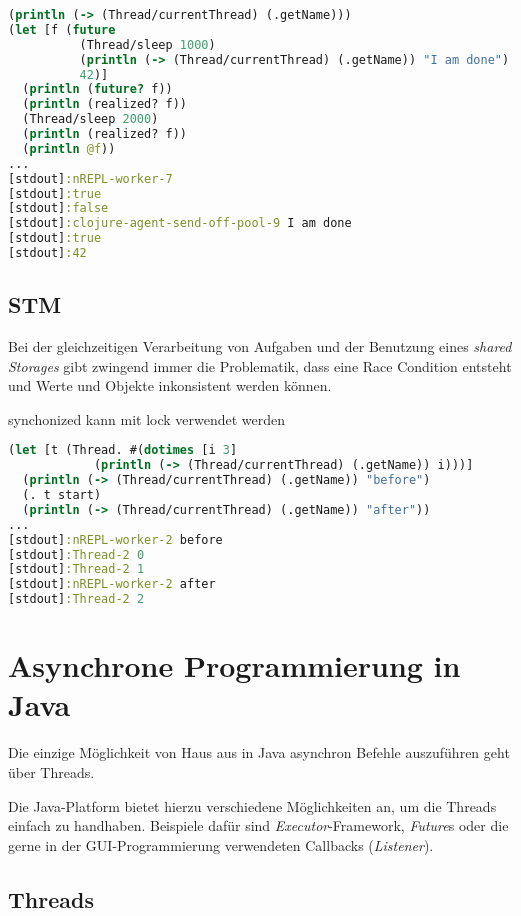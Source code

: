 \begin{lstlisting}[language=Clojure,caption=Das asynchrone Ausführen von Befehlen mit der Methode \textit{future},label=lst:clojure_future]
(println (-> (Thread/currentThread) (.getName)))
(let [f (future
          (Thread/sleep 1000)
          (println (-> (Thread/currentThread) (.getName)) "I am done")
          42)]
  (println (future? f))
  (println (realized? f))
  (Thread/sleep 2000)
  (println (realized? f))
  (println @f))
...
[stdout]:nREPL-worker-7
[stdout]:true
[stdout]:false
[stdout]:clojure-agent-send-off-pool-9 I am done
[stdout]:true
[stdout]:42
\end{lstlisting}

\subsection*{\acl{STM}}
Bei der gleichzeitigen Verarbeitung von Aufgaben und der Benutzung eines \textit{shared Storages} gibt zwingend immer die Problematik, dass eine Race Condition entsteht und Werte und Objekte inkonsistent werden können.

\hierweiter

synchonized kann mit lock verwendet werden



\begin{lstlisting}[language=Clojure,caption=Definition und Erzeugung eines Threads in Clojure,label=lst:clojure_thread]
(let [t (Thread. #(dotimes [i 3]
            (println (-> (Thread/currentThread) (.getName)) i)))]
  (println (-> (Thread/currentThread) (.getName)) "before")
  (. t start)
  (println (-> (Thread/currentThread) (.getName)) "after"))
...  
[stdout]:nREPL-worker-2 before
[stdout]:Thread-2 0
[stdout]:Thread-2 1
[stdout]:nREPL-worker-2 after
[stdout]:Thread-2 2
\end{lstlisting}
\section{Asynchrone Programmierung in Java}
Die einzige Möglichkeit von Haus aus in Java asynchron Befehle auszuführen geht über Threads.

Die Java-Platform bietet hierzu verschiedene Möglichkeiten an, um die Threads einfach zu handhaben. Beispiele dafür sind \textit{Executor}-Framework, \textit{Future}s oder die gerne in der \acs{GUI}-Programmierung verwendeten Callbacks (\textit{Listener}).

\subsection{Threads}

